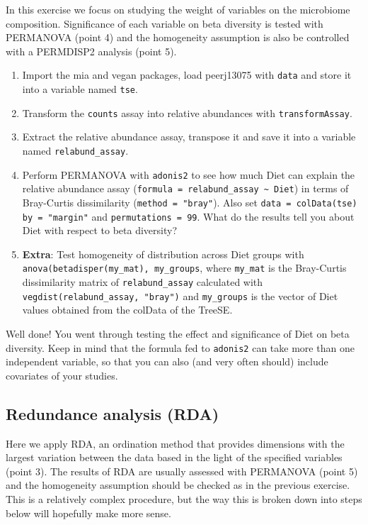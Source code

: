 \documentclass[
]{book}
\providecommand{\tightlist}{%
  \setlength{\itemsep}{0pt}\setlength{\parskip}{0pt}}
\begin{document}
In this exercise we focus on studying the weight of variables on the microbiome
composition. Significance of each variable on beta diversity is tested with
PERMANOVA (point 4) and the homogeneity assumption is also be controlled with a
PERMDISP2 analysis (point 5).

\begin{enumerate}
\def\labelenumi{\arabic{enumi}.}
\tightlist
\item
  Import the mia and vegan packages, load peerj13075 with \texttt{data} and store it
  into a variable named \texttt{tse}.
\item
  Transform the \texttt{counts} assay into relative abundances with \texttt{transformAssay}.
\item
  Extract the relative abundance assay, transpose it and save it into
  a variable named \texttt{relabund\_assay}.
\item
  Perform PERMANOVA with \texttt{adonis2} to see how much Diet can explain the relative
  abundance assay (\texttt{formula\ =\ relabund\_assay\ \textasciitilde{}\ Diet}) in terms of Bray-Curtis
  dissimilarity (\texttt{method\ =\ "bray"}). Also set \texttt{data\ =\ colData(tse)}
  \texttt{by\ =\ "margin"} and \texttt{permutations\ =\ 99}. What do the results tell you about
  Diet with respect to beta diversity?
\item
  \textbf{Extra}: Test homogeneity of distribution across Diet groups with
  \texttt{anova(betadisper(my\_mat),\ my\_groups}, where \texttt{my\_mat} is the Bray-Curtis
  dissimilarity matrix of \texttt{relabund\_assay} calculated with
  \texttt{vegdist(relabund\_assay,\ "bray")} and \texttt{my\_groups} is the vector of Diet values
  obtained from the colData of the TreeSE.
\end{enumerate}

Well done! You went through testing the effect and significance of Diet on beta
diversity. Keep in mind that the formula fed to \texttt{adonis2} can take more than one
independent variable, so that you can also (and very often should) include
covariates of your studies.

\hypertarget{redundance-analysis-rda}{%
\subsection{Redundance analysis (RDA)}\label{redundance-analysis-rda}}

Here we apply RDA, an ordination method that provides dimensions with
the largest variation between the data based in the light of the specified
variables (point 3). The results of RDA are usually assessed with PERMANOVA
(point 5) and the homogeneity assumption should be checked as in the previous
exercise. This is a relatively complex procedure, but the way this is broken
down into steps below will hopefully make more sense.
\end{document}
